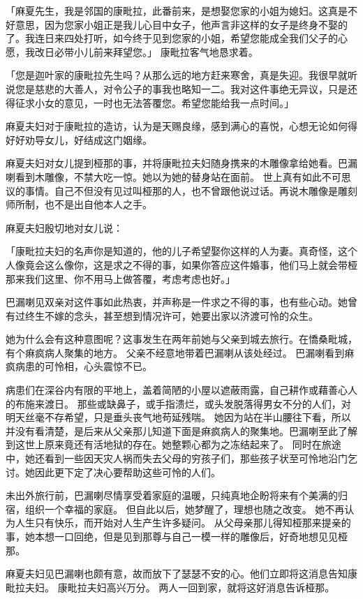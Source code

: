 \documentclass[twoside,openany]{book}
\begin{document}
「麻夏先生，我是邻国的康毗拉，此番前来，是想娶您家的小姐为媳妇。这真是不好意思，因为您家小姐正是我儿心目中女子，他声言非这样的女子是终身不娶的了。我连日来四处打听，如今终于见到您家的小姐，希望您能成全我们父子的心愿，我改日必带小儿前来拜望您。」
康毗拉客气地恳求着。

「您是迦叶家的康毗拉先生吗？从那么远的地方赶来寒舍，真是失迎。我很早就听说您是慈悲的大善人，对令公子的事我也略知一二。我对这件事绝无异议，只是还得征求小女的意见，一时也无法答覆您。希望您能给我一点时间。」

麻夏夫妇对于康毗拉的造访，认为是天赐良缘，感到满心的喜悦，心想无论如何得好好劝导女儿，好结成这门姻缘。

麻夏夫妇对女儿提到桠那的事，并将康毗拉夫妇随身携来的木雕像拿给她看。巴漏喇看到木雕像，不禁大吃一惊。她以为她的替身站在面前。
世上真有如此不可思议的事情。自己不但没有见过叫桠那的人，也不曾跟他说过话。再说木雕像是雕刻师所制，也不是出自他本人之手。

麻夏夫妇殷切地对女儿说：

「康毗拉夫妇的名声你是知道的，他的儿子希望娶你这样的人为妻。真奇怪，这个人像竟会这么像你，这是求之不得的事，如果你答应这件婚事，他们马上就会带桠那来我们这里、你不用马上做答覆，考虑考虑也好。」

巴漏喇见双亲对这件事如此热衷，并声称是一件求之不得的事，也有些心动。她曾有过终生不嫁的念头，甚至想到情况许可，她要出家以济渡可怜的众生。

她为什么会有这种意图呢？这事发生在两年前她与父亲到城去旅行。在憍桑毗城，有个痳疯病人聚集的地方。
父亲不经意地带着巴漏喇从该处经过。
巴漏喇看到痳疯病患的可怜相，心头震惊不已。

病患们在深谷内有限的平地上，盖着简陋的小屋以遮蔽雨露，自己耕作或藉善心人的布施来渡日。
那些或缺鼻子，或手指溃烂，或头发脱落得男女不分的人们，对明天丝毫不存希望，只是垂头丧气地苟延残喘。
她因为站在半山腰往下看，所以并没有看清楚，是后来从父亲那儿知道下面是痳疯病人的聚集地。巴漏喇至此了解到这世上原来竟还有活地狱的存在。她整颗心都为之冻结起来了。
同时在旅途中，她还看到一些因天灾人祸而失去父母的穷孩子们，那些孩子状至可怜地沿门乞讨。她因此更下定了决心要帮助这些可怜的人们。

未出外旅行前，巴漏喇尽情享受着家庭的温暖，只纯真地企盼将来有个美满的归宿，组织一个幸福的家庭。
但自此以后，她梦醒了，理想也随之改变。
她不再认为人生只有快乐，而开始对人生产生许多疑问。
从父母亲那儿得知桠那来提亲的事，她本想一口回绝，但是见到那尊与自己一模一样的雕像后，好奇地想见见桠那。

麻夏夫妇见巴漏喇也颇有意，故而放下了瑟瑟不安的心。他们立即将这消息告知康毗拉夫妇。
康毗拉夫妇高兴万分。
两人一回到家，就将这好消息告诉桠那。
\end{document}
